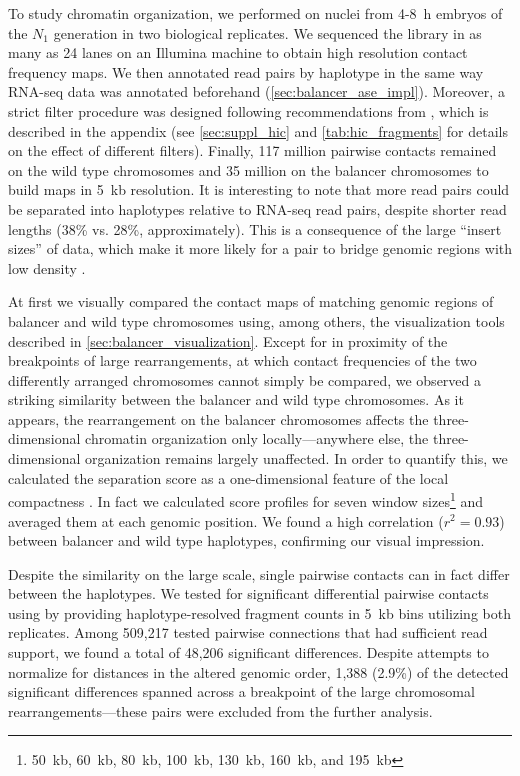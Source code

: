 To study chromatin organization, we performed \hic on nuclei from 4-8~h embryos
of the $N_1$ generation in two biological replicates. We sequenced the \hic
library in as many as 24 lanes on an Illumina machine to obtain high resolution
contact frequency maps. We then annotated read pairs by haplotype in the same
way RNA-seq data was annotated beforehand (\cref{sec:balancer_ase_impl}).
Moreover, a strict filter procedure was designed following recommendations from
\citet{Ramirez2018}, which is described in the appendix (see \cref{sec:suppl_hic}
and \cref{tab:hic_fragments} for details on the effect of different filters).
Finally, 117 million pairwise contacts remained on the wild type chromosomes
and 35 million on the balancer chromosomes to build \hic maps in 5~kb
resolution. It is interesting to note that more \hic read pairs could be
separated into haplotypes relative to RNA-seq read pairs, despite shorter read
lengths (38\% vs. 28\%, approximately). This is a consequence of the large
``insert sizes'' of \hic data, which make it more likely for a pair to bridge
genomic regions with low \snv density \citep{Edge2017}.

At first we visually compared the contact maps of matching genomic regions of
balancer and wild type chromosomes using, among others, the visualization tools
described in \cref{sec:balancer_visualization}. Except for in proximity of the
breakpoints of large rearrangements, at which contact frequencies of the two
differently arranged chromosomes cannot simply be compared, we observed a
striking similarity between the balancer and wild type chromosomes. As it
appears, the rearrangement on the balancer chromosomes affects the
three-dimensional chromatin organization only locally---anywhere else, the
three-dimensional organization remains largely unaffected. In order to quantify this, we
calculated the \tad separation score as a one-dimensional feature of the local
compactness \citep{Ramirez2015,Ramirez2018}. In fact we calculated score
profiles for seven window sizes\footnote{50~kb, 60~kb, 80~kb, 100~kb, 130~kb,
160~kb, and 195~kb} and averaged them at each genomic position. We found a high
correlation ($r^2 = 0.93$) between balancer and wild type haplotypes,
confirming our visual impression.

Despite the similarity on the large scale, single pairwise contacts can in fact
differ between the haplotypes. We tested for significant differential
pairwise contacts using \deseq by providing haplotype-resolved fragment counts
in 5~kb bins utilizing both \hic replicates. Among 509,217 tested pairwise
connections that had sufficient read support, we found a total of 48,206
significant differences. Despite attempts to normalize for distances in the
altered genomic order, 1,388 (2.9\%) of the detected significant differences
spanned across a breakpoint of the large chromosomal rearrangements---these
pairs were excluded from the further analysis.

